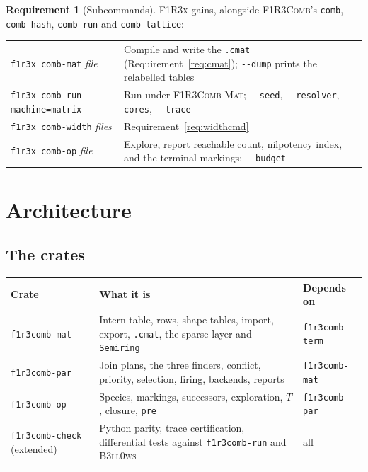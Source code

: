 \documentclass[11pt,a4paper]{article}
\newcommand{\code}[1]{\texttt{#1}}
\newcommand{\Comb}{\textsc{F1R3Comb}}
\newcommand{\Mat}{\textsc{F1R3Comb-Mat}}
\newcommand{\Bell}{\textsc{B3ll0ws}}
\newcommand{\Fx}{\textsc{F1R3x}}
\theoremstyle{definition}
\newtheorem{requirement}[definition]{Requirement}
\theoremstyle{plain}
\begin{document}
\begin{requirement}[Subcommands]\label{req:fx}
\Fx{} gains, alongside \Comb's \code{comb}, \code{comb-hash},
\code{comb-run} and \code{comb-lattice}:
\begin{center}
\begin{tabularx}{\linewidth}{@{}l>{\raggedright\arraybackslash}X@{}}
\toprule
\code{f1r3x comb-mat} \emph{file} & Compile and write the \code{.cmat}
(Requirement~\ref{req:cmat}); \code{-{}-dump} prints the relabelled tables\\
\code{f1r3x comb-run --machine=matrix} & Run under \Mat; \code{-{}-seed},
\code{-{}-resolver}, \code{-{}-cores}, \code{-{}-trace}\\
\code{f1r3x comb-width} \emph{files} & Requirement~\ref{req:widthcmd}\\
\code{f1r3x comb-op} \emph{file} & Explore, report reachable count,
nilpotency index, and the terminal markings; \code{-{}-budget}\\
\bottomrule
\end{tabularx}
\end{center}
\end{requirement}

\section{Architecture}\label{sec:arch}

\subsection{The crates}

\begin{center}
\begin{tabularx}{\linewidth}{@{}l>{\raggedright\arraybackslash}Xl@{}}
\toprule
Crate & What it is & Depends on\\
\midrule
\code{f1r3comb-mat} & Intern table, rows, shape tables, import, export,
\code{.cmat}, the sparse layer and \code{Semiring} & \code{f1r3comb-term}\\
\code{f1r3comb-par} & Join plans, the three finders, conflict, priority,
selection, firing, backends, reports & \code{f1r3comb-mat}\\
\code{f1r3comb-op} & Species, markings, successors, exploration, $T$,
closure, \code{pre} & \code{f1r3comb-par}\\
\code{f1r3comb-check} (extended) & Python parity, trace certification,
differential tests against \code{f1r3comb-run} and \Bell & all\\
\bottomrule
\end{tabularx}
\end{center}
\end{document}

